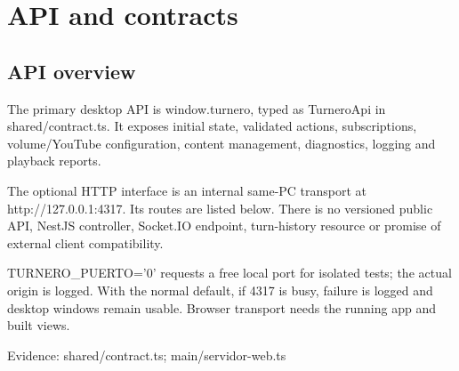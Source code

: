 \section{API and contracts}
\subsection{API overview}

The primary desktop API is window.turnero, typed as TurneroApi in shared/contract.ts. It exposes initial state, validated actions, subscriptions, volume/YouTube configuration, content management, diagnostics, logging and playback reports.

The optional HTTP interface is an internal same-PC transport at http://127.0.0.1:4317. Its routes are listed below. There is no versioned public API, NestJS controller, Socket.IO endpoint, turn-history resource or promise of external client compatibility.

TURNERO\_PUERTO='0' requests a free local port for isolated tests; the actual origin is logged. With the normal default, if 4317 is busy, failure is logged and desktop windows remain usable. Browser transport needs the running app and built views.

Evidence: shared/contract.ts; main/servidor-web.ts

